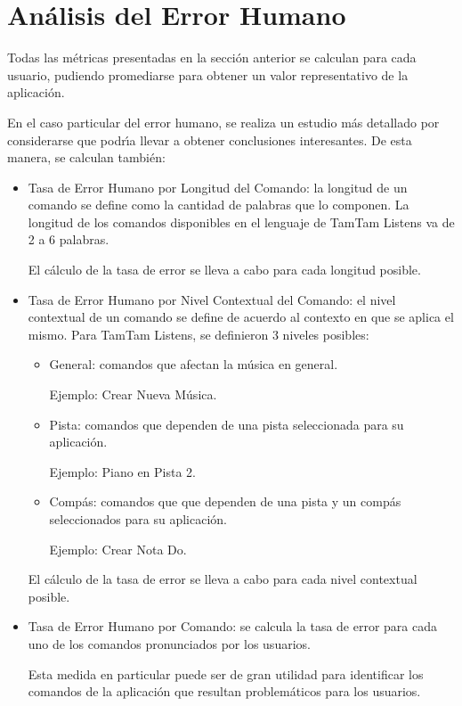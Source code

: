 \section{An\'alisis del Error Humano}
\label{sec:evaluacionError}
Todas las m\'etricas presentadas en la secci\'on anterior se calculan para cada usuario,
pudiendo promediarse para obtener un valor representativo de la aplicaci\'on.

En el caso particular del error humano, se realiza un estudio m\'as detallado
por considerarse que podr{\'\i}a llevar a obtener conclusiones interesantes. De esta manera,
se calculan tambi\'en:

\begin{itemize}
	\item Tasa de Error Humano por Longitud del Comando: la longitud de un comando se define
	como la cantidad de palabras que lo componen. La longitud de los comandos disponibles en el 
	lenguaje de TamTam Listens va de 2 a 6 palabras.

	El c\'alculo de la tasa de error se lleva a cabo para cada longitud posible.  


	\item Tasa de Error Humano por Nivel Contextual del Comando: el nivel contextual de un comando
	se define de acuerdo al contexto en que se aplica el mismo.
	Para TamTam Listens, se definieron 3 niveles posibles:
		\begin{itemize}
			\item General: comandos que afectan la m\'usica en general. 

			Ejemplo: Crear Nueva M\'usica.
			\item Pista: comandos que dependen de una pista seleccionada para su aplicaci\'on. 

			Ejemplo: Piano en Pista 2.
			\item Comp\'as: comandos que que dependen de una pista y un comp\'as seleccionados 
			para su aplicaci\'on. 

			Ejemplo: Crear Nota Do.
		\end{itemize}
	
		
	El c\'alculo de la tasa de error se lleva a cabo para cada nivel contextual posible.

	\item Tasa de Error Humano por Comando: se calcula la tasa de error para cada uno
	de los comandos pronunciados por los usuarios.

	Esta medida en particular puede ser de gran utilidad para identificar los comandos de la
	aplicaci\'on que resultan problem\'aticos para los usuarios.
	

\end{itemize}
